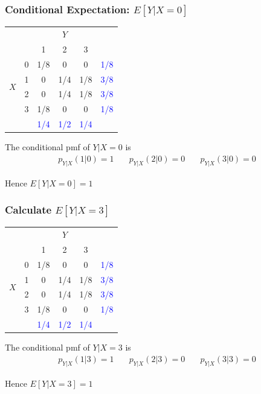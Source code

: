\documentclass[handout]{beamer}
\begin{document}
\begin{frame}
	\frametitle{Conditional Expectation: $E[Y|X=0]$}

\footnotesize
\begin{table}
\begin{tabular}{|cc|ccc|c|}
\hline
&&\multicolumn{3}{c|}{$Y$}&\\
&&1 & 2&3&\\
\hline
\multirow{4}{*}{$X$}
&0& \multicolumn{1}{|c}{\alert{1/8}} & \alert{0}& \alert{0}&\textcolor{blue}{1/8}\\
&1& \multicolumn{1}{|c}{\alert{0}} & \alert{1/4}&\alert{1/8}&\textcolor{blue}{3/8}\\
&2& \multicolumn{1}{|c}{\alert{0}} & \alert{1/4}&\alert{1/8}&\textcolor{blue}{3/8}\\
&3& \multicolumn{1}{|c}{\alert{1/8}} & \alert{0}&\alert{0}&\textcolor{blue}{1/8}\\
\hline
&&\textcolor{blue}{1/4}&\textcolor{blue}{1/2}&\textcolor{blue}{1/4}&\\
\hline
\end{tabular}
\end{table}

The conditional pmf of $Y|X=0$ is 
	$$\boxed{\begin{array}{ccc}p_{Y|X}(1|0) =1 \quad&p_{Y|X}(2|0) =0 \quad&p_{Y|X}(3|0) =0\end{array}}$$
	

\alert{Hence $E[Y|X=0] = 1$}

\end{frame}
\begin{frame}
	\frametitle{Calculate $E[Y|X=3]$}

\footnotesize
\begin{table}
\begin{tabular}{|cc|ccc|c|}
\hline
&&\multicolumn{3}{c|}{$Y$}&\\
&&1 & 2&3&\\
\hline
\multirow{4}{*}{$X$}
&0& \multicolumn{1}{|c}{\alert{1/8}} & \alert{0}& \alert{0}&\textcolor{blue}{1/8}\\
&1& \multicolumn{1}{|c}{\alert{0}} & \alert{1/4}&\alert{1/8}&\textcolor{blue}{3/8}\\
&2& \multicolumn{1}{|c}{\alert{0}} & \alert{1/4}&\alert{1/8}&\textcolor{blue}{3/8}\\
&3& \multicolumn{1}{|c}{\alert{1/8}} & \alert{0}&\alert{0}&\textcolor{blue}{1/8}\\
\hline
&&\textcolor{blue}{1/4}&\textcolor{blue}{1/2}&\textcolor{blue}{1/4}&\\
\hline
\end{tabular}
\end{table}


The conditional pmf of $Y|X=3$ is
	$$\boxed{\begin{array}{ccc}p_{Y|X}(1|3) =1 \quad&p_{Y|X}(2|3) =0 \quad&p_{Y|X}(3|3) =0\end{array}}$$
	
\alert{Hence $E[Y|X=3] = 1$}

\end{frame}
\end{document}
